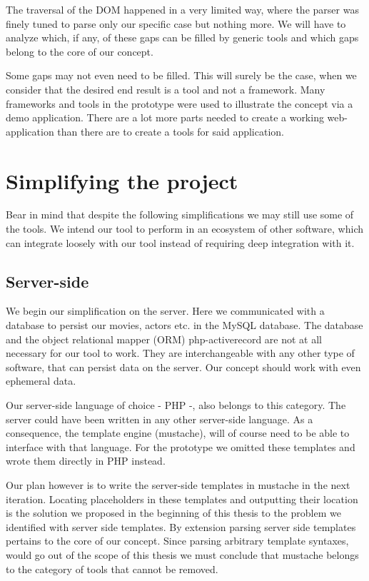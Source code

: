 The traversal of the DOM happened in a very limited way, where the parser was
finely tuned to parse only our specific case but nothing more.
We will have to analyze which, if any, of these gaps can be filled by generic
tools and which gaps belong to the core of our concept.

Some gaps may not even need to be filled. This will surely be the case,
when we consider that the desired end result is a tool and not a framework.
Many frameworks and tools in the prototype were used to illustrate the concept
via a demo application. There are a lot more parts needed to create a working
web-application than there are to create a tools for said application.



\section{Simplifying the project}

Bear in mind that despite the following simplifications we may still use some
of the tools. We intend our tool to perform in an ecosystem of other software,
which can integrate loosely with our tool instead of requiring deep integration
with it.

\subsection{Server-side}
We begin our simplification on the server. Here we communicated with a database
to persist our movies, actors etc. in the MySQL database. The database and the
object relational mapper (ORM) php-activerecord are not at all necessary for our
tool to work. They are interchangeable with any other type of software, that can
persist data on the server. Our concept should work with even ephemeral data.

Our server-side language of choice - PHP -, also belongs to this category.
The server could have been written in any other server-side language.
As a consequence, the template engine (mustache), will of course need to be
able to interface with that language. For the prototype we omitted these
templates and wrote them directly in PHP instead.

Our plan however is to write the server-side templates in mustache in the next
iteration.
Locating placeholders in these templates and outputting their location
is the solution we proposed in the beginning of this thesis to the problem
we identified with server side templates.
By extension parsing server side templates pertains to the core of our concept.
Since parsing arbitrary template syntaxes, would go out of the scope of this
thesis we must conclude that mustache belongs to the category of tools that
cannot be removed.

